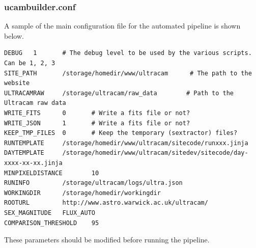 \subsubsection{ucambuilder.conf}
A sample of the main configuration file for the automated pipeline is shown below.
\lstset{basicstyle=\scriptsize}
\begin{lstlisting}
DEBUG   1       # The debug level to be used by the various scripts. Can be 1, 2, 3
SITE_PATH       /storage/homedir/www/ultracam      # The path to the website
ULTRACAMRAW     /storage/ultracam/raw_data        # Path to the Ultracam raw data
WRITE_FITS      0       # Write a fits file or not?
WRITE_JSON      1       # Write a fits file or not?
KEEP_TMP_FILES  0       # Keep the temporary (sextractor) files?
RUNTEMPLATE     /storage/homedir/www/ultracam/sitecode/runxxx.jinja
DAYTEMPLATE     /storage/homedir/www/ultracam/sitedev/sitecode/day-xxxx-xx-xx.jinja
MINPIXELDISTANCE        10
RUNINFO         /storage/ultracam/logs/ultra.json
WORKINGDIR      /storage/homedir/workingdir
ROOTURL         http://www.astro.warwick.ac.uk/ultracam/
SEX_MAGNITUDE   FLUX_AUTO
COMPARISON_THRESHOLD    95
\end{lstlisting}

These parameters should be modified before running the pipeline.

